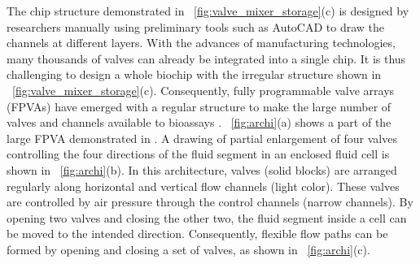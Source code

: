 \documentclass[journal,twoside]{IEEEtran}
\begin{document}
The chip structure demonstrated in \figname~\ref{fig:valve_mixer_storage}(c)
is designed by researchers manually
using preliminary tools such as AutoCAD to draw the channels at different
layers. 
With the advances of manufacturing technologies, many thousands of valves can
already be integrated into a single chip.
It is thus challenging to design a whole biochip with the irregular structure
shown in \figname~\ref{fig:valve_mixer_storage}(c).
Consequently, 
fully programmable valve arrays (FPVAs)
have emerged with a regular structure to make the large number of valves and
channels available to bioassays \cite{JMSQ07,matrix11}.
\figname~\ref{fig:archi}(a) shows a part of the large FPVA demonstrated in
\cite{matrix11}. A drawing of partial enlargement of four valves controlling
the four directions of the fluid segment  in an enclosed fluid cell is shown in
\figname~\ref{fig:archi}(b). In this architecture, valves (solid blocks) are
arranged regularly along horizontal and vertical flow channels (light color).
These valves are controlled by air pressure through the control
channels (narrow channels). By opening two valves and closing the other two,
the fluid segment inside a cell can be moved to the intended direction.
Consequently, flexible flow paths can be formed by opening
and closing a set of valves, as shown in \figname~\ref{fig:archi}(c). 
\end{document}
